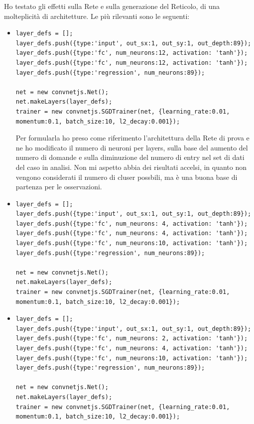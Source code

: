 Ho testato gli effetti sulla Rete e sulla generazione del Reticolo, di una molteplicit\`a di architetture. Le pi\`u rilevanti sono le seguenti:
\begin{itemize}
\item \begin{verbatim}
layer_defs = [];
layer_defs.push({type:'input', out_sx:1, out_sy:1, out_depth:89});
layer_defs.push({type:'fc', num_neurons:12, activation: 'tanh'});
layer_defs.push({type:'fc', num_neurons:12, activation: 'tanh'});
layer_defs.push({type:'regression', num_neurons:89});
        
net = new convnetjs.Net();
net.makeLayers(layer_defs);
trainer = new convnetjs.SGDTrainer(net, {learning_rate:0.01, 
momentum:0.1, batch_size:10, l2_decay:0.001});
\end{verbatim}
\noindent
Per formularla ho preso come riferimento l'architettura della Rete di prova e ne ho modificato il numero di neuroni per layers, sulla base del aumento del numero di domande e sulla diminuzione del numero di entry nel set di dati del caso in analisi. Non mi aspetto abbia dei risultati accelsi, in quanto non vengono considerati il numero di cluser possbili, ma è una buona base di partenza per le osservazioni.
\item \begin{verbatim}
layer_defs = [];
layer_defs.push({type:'input', out_sx:1, out_sy:1, out_depth:89});
layer_defs.push({type:'fc', num_neurons: 4, activation: 'tanh'});
layer_defs.push({type:'fc', num_neurons: 4, activation: 'tanh'});
layer_defs.push({type:'fc', num_neurons:10, activation: 'tanh'});
layer_defs.push({type:'regression', num_neurons:89});
        
net = new convnetjs.Net();
net.makeLayers(layer_defs);
trainer = new convnetjs.SGDTrainer(net, {learning_rate:0.01, 
momentum:0.1, batch_size:10, l2_decay:0.001});
\end{verbatim}

\item \begin{verbatim}
layer_defs = [];
layer_defs.push({type:'input', out_sx:1, out_sy:1, out_depth:89});
layer_defs.push({type:'fc', num_neurons: 2, activation: 'tanh'});
layer_defs.push({type:'fc', num_neurons: 4, activation: 'tanh'});
layer_defs.push({type:'fc', num_neurons:10, activation: 'tanh'});
layer_defs.push({type:'regression', num_neurons:89});
        
net = new convnetjs.Net();
net.makeLayers(layer_defs);
trainer = new convnetjs.SGDTrainer(net, {learning_rate:0.01, 
momentum:0.1, batch_size:10, l2_decay:0.001});
\end{verbatim}


\end{itemize}
